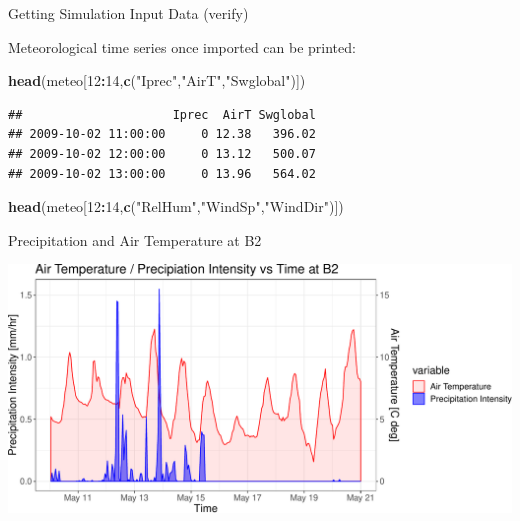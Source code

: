 \documentclass[ignorenonframetext,]{beamer}
\newenvironment{Shaded}{\begin{snugshade}}{\end{snugshade}}
\newcommand{\KeywordTok}[1]{\textcolor[rgb]{0.13,0.29,0.53}{\textbf{#1}}}
\newcommand{\DecValTok}[1]{\textcolor[rgb]{0.00,0.00,0.81}{#1}}
\newcommand{\StringTok}[1]{\textcolor[rgb]{0.31,0.60,0.02}{#1}}
\newcommand{\OperatorTok}[1]{\textcolor[rgb]{0.81,0.36,0.00}{\textbf{#1}}}
\newcommand{\NormalTok}[1]{#1}
\begin{document}
\begin{frame}[fragile]{Getting Simulation Input Data (verify)}

Meteorological time series once imported can be printed:

\begin{Shaded}
\begin{Highlighting}[]
\KeywordTok{head}\NormalTok{(meteo[}\DecValTok{12}\OperatorTok{:}\DecValTok{14}\NormalTok{,}\KeywordTok{c}\NormalTok{(}\StringTok{"Iprec"}\NormalTok{,}\StringTok{"AirT"}\NormalTok{,}\StringTok{"Swglobal"}\NormalTok{)])}
\end{Highlighting}
\end{Shaded}

\begin{verbatim}
##                     Iprec  AirT Swglobal
## 2009-10-02 11:00:00     0 12.38   396.02
## 2009-10-02 12:00:00     0 13.12   500.07
## 2009-10-02 13:00:00     0 13.96   564.02
\end{verbatim}

\begin{Shaded}
\begin{Highlighting}[]
\KeywordTok{head}\NormalTok{(meteo[}\DecValTok{12}\OperatorTok{:}\DecValTok{14}\NormalTok{,}\KeywordTok{c}\NormalTok{(}\StringTok{"RelHum"}\NormalTok{,}\StringTok{"WindSp"}\NormalTok{,}\StringTok{"WindDir"}\NormalTok{)])}
\end{Highlighting}
\end{Shaded}

\end{frame}

\begin{frame}{Precipitation and Air Temperature at B2}

\includegraphics{presentation_files/figure-beamer/unnamed-chunk-5-1.pdf}

\end{frame}
\end{document}
